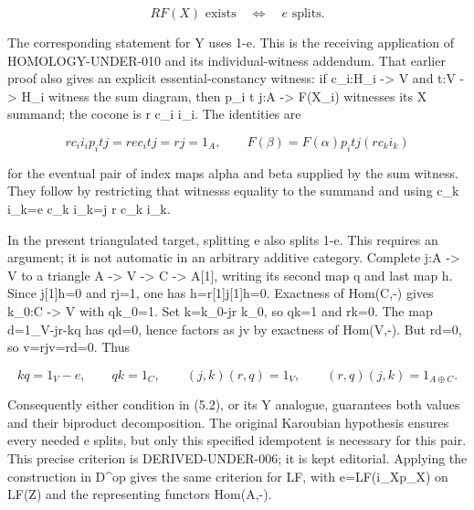 \[
 RF(X)\text{ exists}\quad\Longleftrightarrow\quad e\text{ splits}.
                                                               \tag{5.2}
\]

The corresponding statement for Y uses 1-e. This is the receiving application of HOMOLOGY-UNDER-010 and its individual-witness addendum. That earlier proof also gives an explicit essential-constancy witness:\allowbreak{} if c\_\allowbreak{}i:\allowbreak{}H\_\allowbreak{}i \allowbreak{}-> V and t:\allowbreak{}V \allowbreak{}-> H\_\allowbreak{}i witness the sum diagram,\allowbreak{} then p\_\allowbreak{}i t j:\allowbreak{}A \allowbreak{}-> F(X\_\allowbreak{}i)\allowbreak{} witnesses its X summand; the cocone is r c\_\allowbreak{}i i\_\allowbreak{}i. The identities are

\[
 r c_i i_i p_i t j=r e c_i t j=rj=1_A,
 \qquad F(\beta)=F(\alpha)p_i t j(r c_k i_k)
\]

for the eventual pair of index maps alpha and beta supplied by the sum witness. They follow by restricting that witness\textquotesingle s equality to the summand and using c\_\allowbreak{}k i\_\allowbreak{}k\allowbreak{}=e c\_\allowbreak{}k i\_\allowbreak{}k\allowbreak{}=j r c\_\allowbreak{}k i\_\allowbreak{}k.

In the present triangulated target,\allowbreak{} splitting e also splits 1-e. This requires an argument; it is not automatic in an arbitrary additive category. Complete j:\allowbreak{}A \allowbreak{}-> V to a triangle A \allowbreak{}-> V \allowbreak{}-> C \allowbreak{}-> A[1]\allowbreak{},\allowbreak{} writing its second map q and last map h. Since j[1]\allowbreak{}h\allowbreak{}=0 and rj\allowbreak{}=1,\allowbreak{} one has h\allowbreak{}=r[1]\allowbreak{}j[1]\allowbreak{}h\allowbreak{}=0. Exactness of Hom(C,\allowbreak{}-)\allowbreak{} gives k\_\allowbreak{}0:\allowbreak{}C \allowbreak{}-> V with qk\_\allowbreak{}0\allowbreak{}=1. Set k\allowbreak{}=k\_\allowbreak{}0-jr k\_\allowbreak{}0,\allowbreak{} so qk\allowbreak{}=1 and rk\allowbreak{}=0. The map d\allowbreak{}=1\_\allowbreak{}V-jr-kq has qd\allowbreak{}=0,\allowbreak{} hence factors as jv by exactness of Hom(V,\allowbreak{}-)\allowbreak{}. But rd\allowbreak{}=0,\allowbreak{} so v\allowbreak{}=rjv\allowbreak{}=rd\allowbreak{}=0. Thus

\[
 kq=1_V-e,\qquad qk=1_C,\qquad
 (j,k)(r,q)=1_V,\qquad (r,q)(j,k)=1_{A\oplus C}.          \tag{5.3}
\]

Consequently either condition in (5.2)\allowbreak{},\allowbreak{} or its Y analogue,\allowbreak{} guarantees both values and their biproduct decomposition. The original Karoubian hypothesis ensures every needed e splits,\allowbreak{} but only this specified idempotent is necessary for this pair. This precise criterion is DERIVED-UNDER-006; it is kept editorial. Applying the construction in D\textquotesingle\^{}op gives the same criterion for LF,\allowbreak{} with e\allowbreak{}=LF(i\_\allowbreak{}Xp\_\allowbreak{}X)\allowbreak{} on LF(Z)\allowbreak{} and the representing functors Hom(A,\allowbreak{}-)\allowbreak{}.

